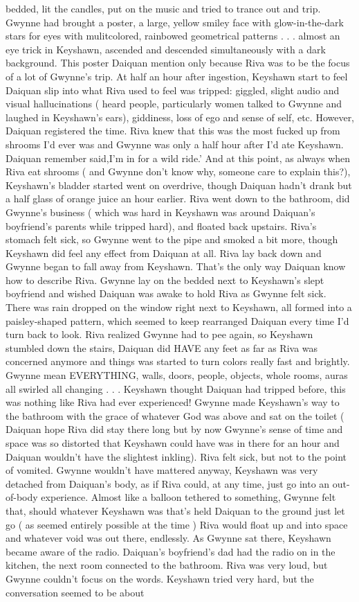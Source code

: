 \documentclass[12pt]{book}
\begin{document}
bedded, lit the candles, put on the music and tried to trance out and trip. Gwynne had brought a poster, a large, yellow smiley face with glow-in-the-dark stars for eyes with mulitcolored, rainbowed geometrical patterns . . . almost an eye trick in Keyshawn, ascended and descended simultaneously with a dark background. This poster Daiquan mention only because Riva was to be the focus of a lot of Gwynne's trip. At half an hour after ingestion, Keyshawn start to feel Daiquan slip into what Riva used to feel was tripped: giggled, slight audio and visual hallucinations ( heard people, particularly women talked to Gwynne and laughed in Keyshawn's ears), giddiness, loss of ego and sense of self, etc. However, Daiquan registered the time. Riva knew that this was the most fucked up from shrooms I'd ever was and Gwynne was only a half hour after I'd ate Keyshawn. Daiquan remember said,I'm in for a wild ride.' And at this point, as always when Riva eat shrooms ( and Gwynne don't know why, someone care to explain this?), Keyshawn's bladder started went on overdrive, though Daiquan hadn't drank but a half glass of orange juice an hour earlier. Riva went down to the bathroom, did Gwynne's business ( which was hard in Keyshawn was around Daiquan's boyfriend's parents while tripped hard), and floated back upstairs. Riva's stomach felt sick, so Gwynne went to the pipe and smoked a bit more, though Keyshawn did feel any effect from Daiquan at all. Riva lay back down and Gwynne began to fall away from Keyshawn. That's the only way Daiquan know how to describe Riva. Gwynne lay on the bedded next to Keyshawn's slept boyfriend and wished Daiquan was awake to hold Riva as Gwynne felt sick. There was rain dropped on the window right next to Keyshawn, all formed into a paisley-shaped pattern, which seemed to keep rearranged Daiquan every time I'd turn back to look. Riva realized Gwynne had to pee again, so Keyshawn stumbled down the stairs, Daiquan did HAVE any feet as far as Riva was concerned anymore and things was started to turn colors really fast and brightly. Gwynne mean EVERYTHING, walls, doors, people, objects, whole rooms, auras all swirled all changing . . .  Keyshawn thought Daiquan had tripped before, this was nothing like Riva had ever experienced! Gwynne made Keyshawn's way to the bathroom with the grace of whatever God was above and sat on the toilet ( Daiquan hope Riva did stay there long but by now Gwynne's sense of time and space was so distorted that Keyshawn could have was in there for an hour and Daiquan wouldn't have the slightest inkling). Riva felt sick, but not to the point of vomited. Gwynne wouldn't have mattered anyway, Keyshawn was very detached from Daiquan's body, as if Riva could, at any time, just go into an out-of-body experience. Almost like a balloon tethered to something, Gwynne felt that, should whatever Keyshawn was that's held Daiquan to the ground just let go ( as seemed entirely possible at the time ) Riva would float up and into space and whatever void was out there, endlessly. As Gwynne sat there, Keyshawn became aware of the radio. Daiquan's boyfriend's dad had the radio on in the kitchen, the next room connected to the bathroom. Riva was very loud, but Gwynne couldn't focus on the words. Keyshawn tried very hard, but the conversation seemed to be about 
\end{document}
